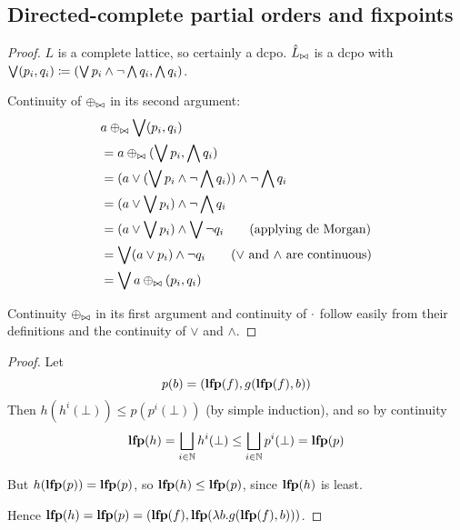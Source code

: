 \subsection{Directed-complete partial orders and fixpoints}

\booleanAlgebraContinuous*
\begin{proof}
  \label{prf:booleanAlgebraContinuous}
  $L$ is a complete lattice, so certainly a dcpo. $\hat{L}_{\bowtie}$ is a
  dcpo with $\bigvee (p_i, q_i) \coloneqq (\bigvee p_i \wedge \neg \bigwedge q_i, \bigwedge q_i)$.

  Continuity of $\oplus_{\bowtie}$ in its second argument:
  \begin{align*}
    &a \oplus_{\bowtie} \bigvee (p_i, q_i)\\
    &= a \oplus_{\bowtie} (\bigvee p_i, \bigwedge q_i)\\
    &= (a \vee (\bigvee p_i \wedge \neg \bigwedge q_i)) \wedge \neg \bigwedge q_i\\
    &= (a \vee \bigvee p_i) \wedge \neg \bigwedge q_i\\
    &= (a \vee \bigvee p_i) \wedge \bigvee \neg q_i \tag{applying de Morgan}\\
    &= \bigvee (a \vee p_i) \wedge \neg q_i \tag{$\vee$ and $\wedge$ are continuous}\\
    &= \bigvee a \oplus_{\bowtie} (p_i, q_i)
  \end{align*}

  Continuity $\oplus_{\bowtie}$ in its first argument and continuity of $\cdot$ follow easily from their definitions and the continuity
  of $\vee$ and $\wedge$.
\end{proof}

\factoringFixpoints*
\begin{proof}
  \label{prf:factoringFixpoints}
  Let
  \begin{displaymath}
    p(b) = (\mathbf{lfp}(f), g(\mathbf{lfp}(f), b))
  \end{displaymath}
  Then $h(h^i(\bot)) \leq p(p^i(\bot))$ (by simple induction), and so by continuity
  \begin{displaymath}
    \mathbf{lfp}(h) = \bigsqcup_{i \in \mathbb{N}} h^i(\bot) \leq \bigsqcup_{i \in \mathbb{N}} p^i(\bot) = \mathbf{lfp}(p)
  \end{displaymath}

  But $h(\mathbf{lfp}(p)) = \mathbf{lfp}(p)$, so $\mathbf{lfp}(h) \leq \mathbf{lfp}(p)$, since $\mathbf{lfp}(h)$ is least.

  Hence $\mathbf{lfp}(h) = \mathbf{lfp}(p) = (\mathbf{lfp}(f), \mathbf{lfp}(\lambda b . g(\mathbf{lfp}(f), b)))$.
\end{proof}

